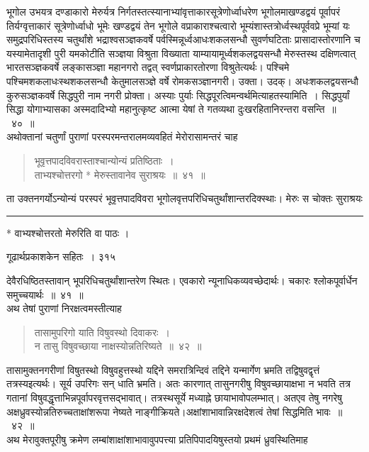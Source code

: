 \documentclass[11pt, openany]{book}
\begin{document}
भूगोल उभयत्र दण्डाकारो मेरुर्यत्र निर्गतस्तत्स्यानाभ्यांवृत्ताकारसूत्रेणोर्ध्वाधरेण भूगोलमाखण्डद्वयं पूर्वापरं तिर्यग्वृत्ताकारं सूत्रेणोर्ध्वाधो भूमेः खण्डद्वयं तेन भूगोले वप्राकाराश्चत्वारो भूम्यंशास्तत्रोर्ध्वस्थपूर्ववप्रे भूम्यां यः समुद्रपरिधिस्तस्य चतुर्थांशे भद्राश्वसञ्ज्ञकवर्षे पर्वस्मिन्नूर्ध्वआधःशकलसन्धौ सुवर्णघटिताः प्रासादास्तोरणानि च यस्यामेतादृशी पुरी यमकोटीति सञ्ज्ञया विश्रुता विख्याता याम्यायामूर्ध्वशकलद्वयसन्धौ मेरुस्तस्थ दक्षिणत्वात् भारतसञ्ज्ञकवर्षे लङ्कासञ्ज्ञा महानगरो तद्वत् स्वर्णप्राकारतोरणा विश्रुतेत्यर्थः। पश्चिमे पश्चिमशकलाधःस्थशकलसन्धौ केतुमालसञ्ज्ञे वर्षे रोमकसञ्ज्ञानगरी। उक्ता। उदक्। अधःशकलद्वयसन्धौ कुरुसञ्ज्ञकवर्षे सिद्धपुरी नाम नगरी प्रोक्ता। अस्याः पुर्याः सिद्धपूरत्विमन्वर्थमित्याह\textendash तस्यामिति~। सिद्धपुर्यां सिद्धा योगाभ्यासका अस्मदादिभ्यो महानुत्कृष्ट आत्मा येषां ते गतव्यथा दुःखरहितानिरन्तरा वसन्ति~॥~४०~॥ \\
\noindent अथोक्तानां चतुर्णां पुराणां परस्परमन्तरालमव्यवहितं मेरोरासामन्तरं चाह \textendash

\begin{quote}
{\ssi भूवृत्तपादविवरास्ताश्चान्योन्यं प्रतिष्ठिताः~।\\
 ताभ्यश्चोत्तरगो * मेरुस्तावानेव सुराश्रयः~॥~४१~॥ }
\end{quote}
 ता उक्तनगर्योऽन्योन्यं परस्परं भूवृत्तपादविवरा भूगोलवृत्तपरिधिचतुर्थांशान्तरदिक्स्थाः। मेरुः स चोक्तः सुराश्रयः 
%

\noindent\rule{\linewidth}{.5pt}
\begin{center}
 * वाभ्यश्चोत्तरतो मेरुरिति वा पाठः ।
\end{center}

\newpage


\hspace{3cm} गूढार्थप्रकाशकेन सहितः~।  \hfill ३१५
\vspace{1cm}


\noindent देवैरधिष्ठितस्तावान् भूपरिधिचतुर्थांशान्तरेण स्थितः। एवकारो न्यूनाधिकव्यवच्छेदार्थः। चकारः श्लोकपूर्वार्धेन समुच्चयार्थः~॥~४१~॥\\
\noindent अथ तेषां पुराणां निरक्षत्वमस्तीत्याह \textendash

\begin{quote}
{\ssi तासामुपरिगो याति विषुवस्थो दिवाकरः~।\\
न तासु विषुवच्छाया नाक्षस्योन्नतिरिष्यते~॥~४२~॥}
\end{quote}
 तासामुक्तनगरीणां विषुतस्थो विषुवहुत्तस्थो यद्दिने समरात्रिन्दिवं तद्दिने यन्मार्गेण भ्रमति तद्विषुवद्वृत्तं तत्रस्यइत्यर्थः। सूर्य उपरिगः सन् धाति भ्रमति। अतः कारणात् तासुनगरीषु विषुवच्छायाक्षभा न भवति तत्र गतानां विषुवद्धृत्ताभिन्नपूर्वापरवृत्तसद्भावात्। तत्रस्थसूर्ये मध्याह्ने छायाभावोपलम्भात्। अतएव तेषु नगरेषु अक्षध्रुवस्योन्नतिरुच्चताक्षांशरूपा नेष्यते नाङ्गीक्रियते।अक्षांशाभावान्निरक्षदेशत्वं तेषां सिद्धमिति भावः~॥~४२~॥\\
\noindent अथ मेरावुक्तपूरीषु क्रमेण लम्बांशाक्षांशाभावावुपपत्त्या प्रतिपिपादयिषुस्तयो प्रथमं ध्रुवस्थितिमाह \textendash
\end{document}
